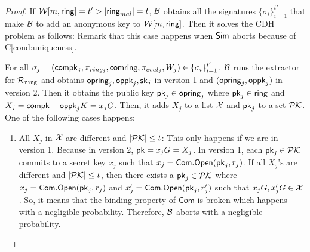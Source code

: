 \begin{proof}
	If $ \mathcal{W}[m,\mathsf{ring}] =t' > |\mathsf{ring}_{mal}| =t$, $ \mathcal{B} $ obtains all the signatures $ \{\sigma_i\}_{i =1}^{t'} $ that make $ \mathcal{B} $ to add an anonymous key to $ \mathcal{W}[m,\mathsf{ring}] $. Then it solves the CDH problem as follows: Remark that this case happens when $ \mathsf{Sim} $ aborts because of C\ref{cond:uniqueness}.
	
	For all $ \sigma_j =(\mathsf{compk}_j,\pi_{ring_j},\mathsf{comring}, \pi_{eval_j},W_j) \in \{\sigma_i\}_{i =1}^{t'} $, $ \mathcal{B} $ runs the extractor for $ \mathcal{R}_{\mathtt{ring}} $ and obtains $\mathsf{opring}_j, \mathsf{oppk}_j, \mathsf{sk}_j$ in version 1 and $ (\mathsf{opring}_j, \mathsf{oppk}_j) $ in version 2. Then it obtains the public key $ \mathsf{pk}_j \in \mathsf{opring}_j$ where $ \mathsf{pk}_j \in \mathsf{ring} $ and  $ X_j = \mathsf{compk}- \mathsf{oppk}_j K = x_j G $.%
	Then, it adds $ X_j $ to a list $ {\mathcal{X}}  $ and $ \mathsf{pk}_j $ to a set $ {\mathcal{PK}} $. One of the following cases happens:
	
	\begin{enumerate}
		
		\item All $ X_j $ in $ {\mathcal{X}} $ are different  and $ |{\mathcal{PK}}| \leq t $:  This only happens if we are in version 1. Because in version 2, $ \mathsf{pk} = x_j G = X_j$. In version 1, each $ \mathsf{pk}_j \in {\ensuremath{\mathcal{PK}}} $ commits to a secret key $ x_j $ such that $ x_j = \mathsf{Com}.\mathsf{Open}(\mathsf{pk}_j, r_j) $. If all $ X_j $'s are different and  $ |{\mathcal{PK}}| \leq t $, then there exists a $ \mathsf{pk}_j \in {\ensuremath{\mathcal{PK}}} $ where $ x_j = \mathsf{Com}.\mathsf{Open}(\mathsf{pk}_j, r_j) $ and $ x'_j = \mathsf{Com}.\mathsf{Open}(\mathsf{pk}_j, r'_j) $ such that $ x_j G, x_j'G \in {\ensuremath{\mathcal{X}}} $. So, it  means that the binding property of $ \mathsf{Com} $ is broken which happens with a negligible probability. Therefore, $ \mathcal{B}  $ aborts with a negligible probability. 
		

\end{enumerate}
\end{proof}
